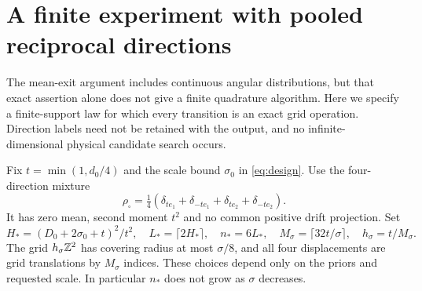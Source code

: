 \section{A finite experiment with pooled reciprocal directions}
\label{sec:pooled-finite}
The mean-exit argument includes continuous angular distributions, but
that exact assertion alone does not give a finite quadrature algorithm.
Here we specify a finite-support law for which every transition is an
exact grid operation. Direction labels need not be retained with the
output, and no infinite-dimensional physical candidate search occurs.

Fix $t=\min(1,d_0/4)$ and the scale bound $\sigma_0$ in
\eqref{eq:design}. Use the four-direction mixture
\begin{equation}\label{eq:compass-law}
 \rho_\square=\tfrac14(\delta_{te_1}+\delta_{-te_1}
                        +\delta_{te_2}+\delta_{-te_2}).
\end{equation}
It has zero mean, second moment $t^2$ and no common positive drift
projection. Set
\begin{equation}\label{eq:pooled-design}
 H_*=(D_0+2\sigma_0+t)^2/t^2,\quad
 L_*=\lceil2H_*\rceil,\quad n_*=6L_*,\quad
 M_\sigma=\lceil32t/\sigma\rceil,\quad h_\sigma=t/M_\sigma.
\end{equation}
The grid $h_\sigma\mathbb Z^2$ has covering radius at most $\sigma/8$,
and all four displacements are grid translations by $M_\sigma$ indices.
These choices depend only on the priors and requested scale. In
particular $n_*$ does not grow as $\sigma$ decreases.

